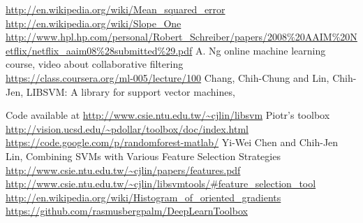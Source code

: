 \documentclass{report}
\begin{document}
\begingroup
\renewcommand{\cleardoublepage}{}
\renewcommand{\clearpage}{}
\begin{thebibliography}{9}

  \url{http://en.wikipedia.org/wiki/Mean_squared_error}
  \url{http://en.wikipedia.org/wiki/Slope_One}
  \url{http://www.hpl.hp.com/personal/Robert_Schreiber/papers/2008\%20AAIM\%20Netflix/netflix_aaim08\%28submitted\%29.pdf}
   A. Ng online machine learning course,
   video about collaborative filtering\\
  \url{https://class.coursera.org/ml-005/lecture/100}
Chang, Chih-Chung and Lin, Chih-Jen,
 LIBSVM: A library for support vector machines,
 
 Code available at \url{http://www.csie.ntu.edu.tw/~cjlin/libsvm}
Piotr's toolbox
\url{http://vision.ucsd.edu/~pdollar/toolbox/doc/index.html}
\url{https://code.google.com/p/randomforest-matlab/}
Yi-Wei Chen and Chih-Jen Lin,
Combining SVMs with Various Feature Selection Strategies
\url{http://www.csie.ntu.edu.tw/~cjlin/papers/features.pdf}
\url{http://www.csie.ntu.edu.tw/~cjlin/libsvmtools/#feature_selection_tool}
\url{http://en.wikipedia.org/wiki/Histogram_of_oriented_gradients}
\url{https://github.com/rasmusbergpalm/DeepLearnToolbox}
\end{thebibliography}
\endgroup
\end{document}
